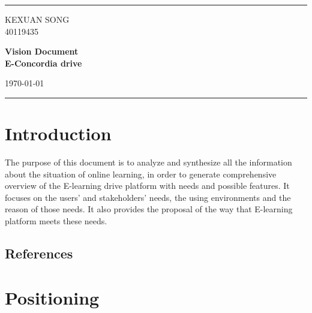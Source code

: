 \documentclass[a4paper]{article}
\begin{document}

\fancyhead[C]{}
\hrule\bigskip %
\begin{minipage}{0.295\textwidth} 
\raggedright
\normalsize
KEXUAN SONG \hfill\\   
40119435\hfill\\
\end{minipage}
\begin{minipage}{0.4\textwidth} 
\centering 
\Large
\textbf{Vision Document}\hfill\\
\textbf{E-Concordia drive}\hfill\\ 
\normalsize 
\end{minipage}
\begin{minipage}{0.295\textwidth} 
\raggedleft
\today\hfill\\
\end{minipage}
\medskip\hrule 
\bigskip


\section{Introduction}
The purpose of this document is to analyze and synthesize all the information about the situation of online learning, in order to generate comprehensive overview of the E-learning drive platform with needs and possible features.  It focuses on the users’ and stakeholders’ needs, the using environments and the reason of those needs. It also provides the proposal of the way that E-learning platform meets these needs.
\subsection{References}


\section{Positioning}
\end{document}
